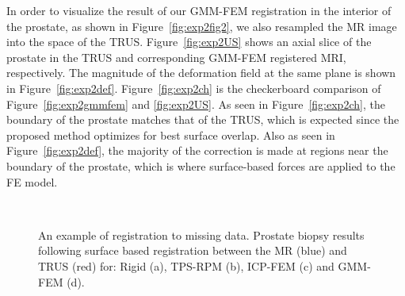 \documentclass[journal]{IEEEtran}
\begin{document}
In order to visualize the result of our GMM-FEM registration in the interior of the prostate, as shown in Figure~\ref{fig:exp2fig2}, we also resampled the MR image into the space of the TRUS. Figure~\ref{fig:exp2US} shows an axial slice of the prostate in the TRUS and corresponding GMM-FEM registered MRI, respectively. The magnitude of the deformation field at the same plane is shown in Figure~\ref{fig:exp2def}. Figure~\ref{fig:exp2ch} is the checkerboard comparison of Figure~\ref{fig:exp2gmmfem} and \ref{fig:exp2US}. As seen in Figure~\ref{fig:exp2ch}, the boundary of the prostate matches that of the TRUS, which is expected since the proposed method optimizes for best surface overlap. Also as seen in Figure~\ref{fig:exp2def}, the majority of the correction is made at regions near the boundary of the prostate, which is where surface-based forces are applied to the FE model.
\begin{figure}[t]
	\centering
	\\
	\hfill
    \caption{An example of registration to missing data. Prostate biopsy results following surface based registration between the MR (blue) and TRUS (red) for: Rigid (a), TPS-RPM (b), ICP-FEM (c) and GMM-FEM (d). \label{fig:exp1fig1}}    
\end{figure}
\end{document}
